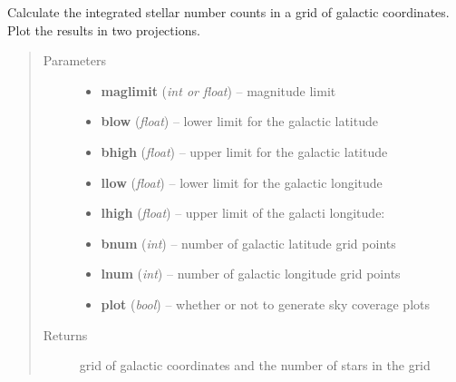 \documentclass[a4paper,11pt,english]{sphinxmanual}
\begin{document}
\begin{fulllineitems}
\label{sources:sources.stellarNumberCounts.skyNumbers}
Calculate the integrated stellar number counts in a grid of galactic coordinates.
Plot the results in two projections.
\begin{quote}\begin{description}
\item[{Parameters}] \leavevmode\begin{itemize}
\item {} 
\textbf{maglimit} (\emph{int or float}) -- magnitude limit

\item {} 
\textbf{blow} (\emph{float}) -- lower limit for the galactic latitude

\item {} 
\textbf{bhigh} (\emph{float}) -- upper limit for the galactic latitude

\item {} 
\textbf{llow} (\emph{float}) -- lower limit for the galactic longitude

\item {} 
\textbf{lhigh} (\emph{float}) -- upper limit of the galacti longitude:

\item {} 
\textbf{bnum} (\emph{int}) -- number of galactic latitude grid points

\item {} 
\textbf{lnum} (\emph{int}) -- number of galactic longitude grid points

\item {} 
\textbf{plot} (\emph{bool}) -- whether or not to generate sky coverage plots

\end{itemize}

\item[{Returns}] \leavevmode
grid of galactic coordinates and the number of stars in the grid

\end{description}\end{quote}

\end{fulllineitems}
\end{document}
